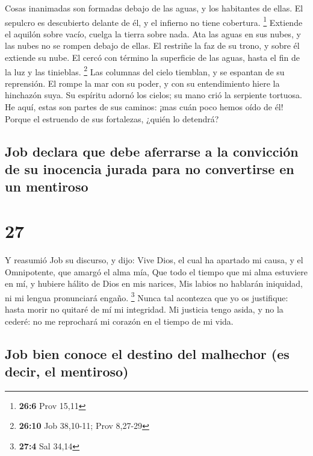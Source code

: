  Cosas inanimadas son formadas debajo de las aguas, y los
habitantes de ellas.  El sepulcro es descubierto delante de
él, y el infierno no tiene cobertura. \footnote{\textbf{26:6} Prov 15,11}
 Extiende el aquilón sobre vacío, cuelga la tierra sobre
nada.  Ata las aguas en sus nubes, y las nubes no se rompen
debajo de ellas.  El restriñe la faz de su trono, y sobre él
extiende su nube.  El cercó con término la superficie de
las aguas, hasta el fin de la luz y las tinieblas. \footnote{\textbf{26:10}
  Job 38,10-11; Prov 8,27-29}  Las columnas del cielo
tiemblan, y se espantan de su reprensión.  El rompe la mar
con su poder, y con su entendimiento hiere la hinchazón suya.
 Su espíritu adornó los cielos; su mano crió la serpiente
tortuosa.  He aquí, estas son partes de sus caminos: ¡mas
cuán poco hemos oído de él! Porque el estruendo de sus fortalezas,
¿quién lo detendrá?

\hypertarget{job-declara-que-debe-aferrarse-a-la-convicciuxf3n-de-su-inocencia-jurada-para-no-convertirse-en-un-mentiroso}{%
\subsection{Job declara que debe aferrarse a la convicción de su
inocencia jurada para no convertirse en un
mentiroso}\label{job-declara-que-debe-aferrarse-a-la-convicciuxf3n-de-su-inocencia-jurada-para-no-convertirse-en-un-mentiroso}}

\hypertarget{section-26}{%
\section{27}\label{section-26}}

 Y reasumió Job su discurso, y dijo:  Vive Dios,
el cual ha apartado mi causa, y el Omnipotente, que amargó el alma mía,
 Que todo el tiempo que mi alma estuviere en mí, y hubiere
hálito de Dios en mis narices,  Mis labios no hablarán
iniquidad, ni mi lengua pronunciará engaño. \footnote{\textbf{27:4} Sal
  34,14}  Nunca tal acontezca que yo os justifique: hasta
morir no quitaré de mí mi integridad.  Mi justicia tengo
asida, y no la cederé: no me reprochará mi corazón en el tiempo de mi
vida.

\hypertarget{job-bien-conoce-el-destino-del-malhechor-es-decir-el-mentiroso}{%
\subsection{Job bien conoce el destino del malhechor (es decir, el
mentiroso)}\label{job-bien-conoce-el-destino-del-malhechor-es-decir-el-mentiroso}}

